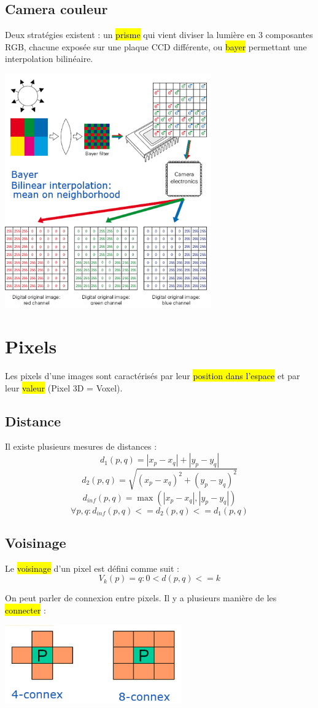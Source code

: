 \documentclass[letterpaper, 12pt]{article}
\newcommand{\alinea}{
\hspace*{0.5cm}}
\begin{document}
	\subsection{Camera couleur}
		\alinea Deux stratégies existent : un \hl{prisme} qui vient diviser la lumière en 3 composantes RGB, chacune exposée sur une 
			plaque CCD différente, ou \hl{bayer} permettant une interpolation bilinéaire.
		\begin{center}
			\includegraphics[width=3.5in]{Images/bayer}
		\end{center}
%
\section{Pixels}
	\alinea Les pixels d'une images sont caractérisés par leur \hl{position dans l'espace} et par leur \hl{valeur}
		(Pixel 3D = Voxel).
	\subsection{Distance}
		\alinea Il existe plusieurs mesures de distances :
		$$ d_1(p, q) = |x_p - x_q| + |y_p - y_q| $$
		$$ d_2(p, q) = \sqrt{(x_p - x_q)^2 + (y_p - y_q)^2} $$
		$$ d_{inf}(p, q) = \max{(|x_p - x_q|, |y_p - y_q|)} $$
		$$ \forall p, q : d_{inf}(p, q) <= d_2(p, q) <= d_1(p, q) $$
	\subsection{Voisinage}
		\alinea Le \hl{voisinage} d'un pixel est défini comme suit :
			$$ V_k(p) = {q: 0 < d(p, q) <= k} $$
		\alinea On peut parler de connexion entre pixels. Il y a plusieurs manière de les \hl{connecter} :
			\begin{center}
				\includegraphics[width=3in]{Images/connex}
			\end{center}
\end{document}
